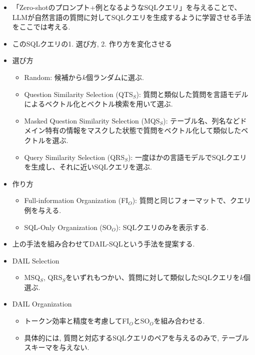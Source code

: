 \documentclass[dvipdfmx,uplatex]{jsarticle}
\theoremstyle{remark}
\newenvironment{method}[1]{
    \begin{tcolorbox}[
        colframe=green!50!black,
        colback=green!50!black!10!white,
        colbacktitle=green!50!black!40!white,
        coltitle=black,
        fonttitle=\bfseries,
        title={#1}
    ]
}{
    \end{tcolorbox}
}
\begin{document}
\begin{method}{In-Context Learning}
\begin{itemize}
    \item 「Zero-shotのプロンプト+例となるようなSQLクエリ」を与えることで、LLMが自然言語の質問に対してSQLクエリを生成するように学習させる手法をここでは考える.
    \item このSQLクエリの1. 選び方, 2. 作り方を変化させる
    \item 選び方
    \begin{itemize}
        \item Random: 候補から$k$個ランダムに選ぶ.
        \item Question Similarity Selection (QTS${}_S$): 質問と類似した質問を言語モデルによるベクトル化とベクトル検索を用いて選ぶ.
        \item Masked Question Similarity Selection (MQS${}_S$): テーブル名、列名などドメイン特有の情報をマスクした状態で質問をベクトル化して類似したベクトルを選ぶ.
        \item Query Similarity Selection (QRS${}_S$): 一度ほかの言語モデルでSQLクエリを生成し、それに近いSQLクエリを選ぶ.
    \end{itemize}
    \item 作り方
    \begin{itemize}
        \item Full-information Organization (FI${}_O$): 質問と同じフォーマットで、クエリ例を与える.
        \item SQL-Only Organization (SO${}_O$): SQLクエリのみを表示する.
    \end{itemize}
    \item 上の手法を組み合わせてDAIL-SQLという手法を提案する.
    \item DAIL Selection 
    \begin{itemize}
        \item MSQ${}_S$, QRS${}_S$をいずれもつかい、質問に対して類似したSQLクエリを$k$個選ぶ.
    \end{itemize}
    \item DAIL Organization
    \begin{itemize}
        \item トークン効率と精度を考慮してFI${}_O$とSO${}_O$を組み合わせる.
        \item 具体的には, 質問と対応するSQLクエリのペアを与えるのみで, テーブルスキーマを与えない.
    \end{itemize}
\end{itemize}
\end{method}
\end{document}
